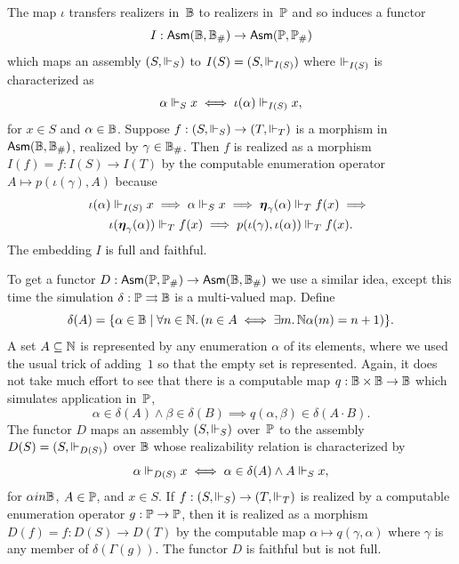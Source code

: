 The map $\iota$ transfers realizers in~$\mathbb{B}$ to realizers
in~$\mathbb{P}$ and so induces a functor
%
\begin{equation*}
  I : \mathsf{Asm}(\mathbb{B}, \mathbb{B}_{\#}) \to \mathsf{Asm}(\mathbb{P}, \mathbb{P}_{\#})
\end{equation*}
%
which maps an assembly $(S, {\Vdash_S})$ to $I(S) = (S, {\Vdash_{I(S)}})$
where $\Vdash_{I(S)}$ is characterized as
%
\begin{equation*}
  \alpha \Vdash_S x \iff
  \iota(\alpha) \Vdash_{I(S)} x,
\end{equation*}
%
for $x \in S$ and $\alpha \in \mathbb{B}$.
%
Suppose $f : (S, {\Vdash_S}) \to (T, {\Vdash_T})$ is a morphism in
$\mathsf{Asm}(\mathbb{B}, \mathbb{B}_{\#})$, realized by $\gamma \in \mathbb{B}_{\#}$.
Then $f$ is realized as a morphism $I(f) = f : I(S) \to I(T)$ by the
computable enumeration operator $A \mapsto p(\iota(\gamma), A)$
because
%
\begin{multline*}
  \iota(\alpha) \Vdash_{I(S)} x \implies
  \alpha \Vdash_S x \implies
  \text{\boldmath{$\eta$}}_{\gamma}(\alpha) \Vdash_T f(x) \implies {}\\
  \iota(\text{\boldmath{$\eta$}}_{\gamma}(\alpha)) \Vdash_T f(x) \implies
  p(\iota(\gamma), \iota(\alpha)) \Vdash_T f(x).
\end{multline*}
%
The embedding $I$ is full and faithful.

To get a functor $D : \mathsf{Asm}(\mathbb{P}, \mathbb{P}_{\#}) \to \mathsf{Asm}(\mathbb{B},
  \mathbb{B}_{\#})$ we use a similar idea, except this time the
simulation $\delta : \mathbb{P} \rightrightarrows \mathbb{B}$ is a multi-valued map.
Define
%
\begin{equation*}
  \delta(A) = \{\alpha \in \mathbb{B} \mid
    \forall n \in \mathbb{N} .\, (n \in A \iff \exists m .\,{\mathbb{N}}{\alpha(m) = n + 1})
  \}.
\end{equation*}
%
A set $A \subseteq \mathbb{N}$ is represented by any enumeration $\alpha$ of
its elements, where we used the usual trick of adding~$1$ so that the
empty set is represented. Again, it does not take much effort to see
that there is a computable map $q : \mathbb{B} \times \mathbb{B} \to \mathbb{B}$
which simulates application in~$\mathbb{P}$,
%
\begin{equation*}
  \alpha \in \delta(A) \land
  \beta \in \delta(B) \implies q(\alpha, \beta) \in \delta(A \cdot B).
\end{equation*}
%
The functor $D$ maps an assembly $(S, {\Vdash_S})$ over~$\mathbb{P}$ to the
assembly $D(S) = (S, {\Vdash_{D(S)}})$ over $\mathbb{B}$ whose realizability
relation is characterized by
%
\begin{equation*}
  \alpha \Vdash_{D(S)} x \iff
  \alpha \in \delta(A) \land A \Vdash_S x,
\end{equation*}
%
for $\alpha in \mathbb{B}$, $A \in \mathbb{P}$, and $x \in S$. If $f : (S,
{\Vdash_S}) \to (T, {\Vdash_T})$ is realized by a computable enumeration
operator $g : \mathbb{P} \to \mathbb{P}$, then it is realized as a morphism
$D(f) = f : D(S) \to D(T)$ by the computable map $\alpha \mapsto
q(\gamma, \alpha)$ where $\gamma$ is any member of
$\delta(\Gamma(g))$. The functor $D$ is faithful but is not full.


